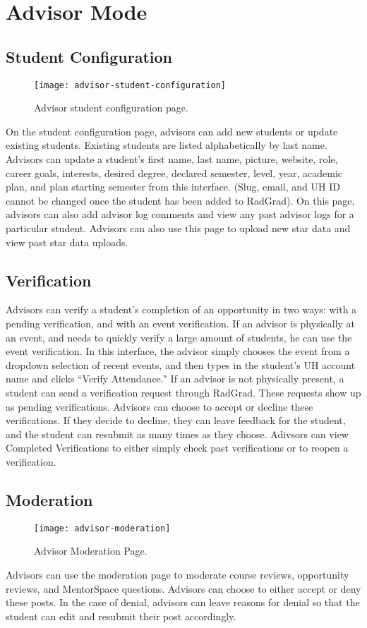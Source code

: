 \section{Advisor Mode}
\subsection{Student Configuration}
\begin{figure}[h]
\centering
\texttt{[image: advisor-student-configuration]}
\caption{Advisor student configuration page.}
\end{figure}
On the student configuration page, advisors can add new students or update existing students. Existing students are listed alphabetically by last name. Advisors can update a student's first name, last name, picture, website, role, career goals, interests, desired degree, declared semester, level, year, academic plan, and plan starting semester from this interface. (Slug, email, and UH ID cannot be changed once the student has been added to RadGrad). On this page, advisors can also add advisor log comments and view any past advisor logs for a particular student. Advisors can also use this page to upload new star data and view past star data uploads. 
\subsection{Verification}
Advisors can verify a student's completion of an opportunity in two ways: with a pending verification, and with an event verification. If an advisor is physically at an event, and needs to quickly verify a large amount of students, he can use the event verification. In this interface, the advisor simply chooses the event from a dropdown selection of recent events, and then types in the student's UH account name and clicks ``Verify Attendance." If an advisor is not physically present, a student can send a verification request through RadGrad. These requests show up as pending verifications. Advisors can choose to accept or decline these verifications. If they decide to decline, they can leave feedback for the student, and the student can resubmit as many times as they choose. Adivsors can view Completed Verifications to either simply check past verifications or to reopen a verification.
\subsection{Moderation}
\begin{figure}[h]
\centering
\texttt{[image: advisor-moderation]}
\caption{Advisor Moderation Page.}
\end{figure}
Advisors can use the moderation page to moderate course reviews, opportunity reviews, and MentorSpace questions. Advisors can choose to either accept or deny these posts. In the case of denial, advisors can leave reasons for denial so that the student can edit and resubmit their post accordingly. 
